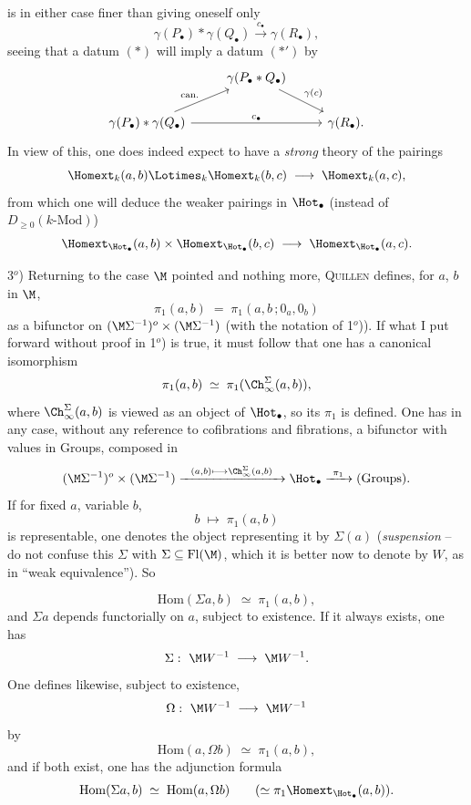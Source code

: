 is in either case finer than giving oneself only
\[
\gamma(P_{\bullet}) * \gamma(Q_{\bullet}) \xrightarrow{\ c_{\bullet}\ } \gamma(R_{\bullet}), \tag*{$(*')$}
\]
seeing that a datum $(*)$ will imply a datum $(*')$ by %
\[
\begin{tikzcd}
 & \gamma(P_{\bullet} * Q_{\bullet}) \arrow[dr, "\gamma(c)"] & \\
\gamma(P_{\bullet}) * \gamma(Q_{\bullet}) \arrow[ur, "\text{can.}"] \arrow[rr, "c_{\bullet}"] & & \gamma(R_{\bullet}).
\end{tikzcd}
\]
In view of this, one does indeed expect to have a \textit{strong} theory of the pairings
\[
\Homext_k(a,b) \Lotimes_k \Homext_k(b,c) \;\longrightarrow\; \Homext_k(a,c),
\]
from which one will deduce the weaker pairings in $\Hot_{\bullet}$ (instead of $D_{\geq 0}(k\text{-Mod})$)
\[
\Homext_{\Hot_{\bullet}}(a,b) \times \Homext_{\Hot_{\bullet}}(b,c) \;\longrightarrow\; \Homext_{\Hot_{\bullet}}(a,c).
\]

3$^o$) Returning to the case $\M$ pointed and nothing more, \textsc{Quillen} defines, for $a$, $b$ in $\M$,
\[
\pi_1(a,b) \;=\; \pi_1(a,b\,;0_a,0_b)
\]
as a bifunctor on $(\M\Sigma^{-1})^o\times(\M\Sigma^{-1})$ (with the notation of 1$^o$)). If what I put forward without proof in 1$^o$) is true, it must follow that one has a canonical isomorphism
\[
\pi_1(a,b) \;\simeq\; \pi_1(\Ch^{\Sigma}_{\infty}(a,b)),
\]
where $\Ch^{\Sigma}_{\infty}(a,b)$ is viewed as an object of $\Hot_{\bullet}$, so its $\pi_1$ is defined. One has in any case, without any reference to cofibrations and fibrations, a bifunctor with values in Groups, composed in
\[
(\M\Sigma^{-1})^o\times(\M\Sigma^{-1}) \xrightarrow{\ \ (a,b)\longmapsto \Ch^{\Sigma}_{\infty}(a,b)\ \ } \Hot_{\bullet} \xrightarrow{\ \pi_1\ } (\text{Groups}).
\]
If for fixed $a$, variable $b$,
\[
b \;\longmapsto\; \pi_1(a,b)
\]
is representable, one denotes the object representing it by $\Sigma(a)$ (\textit{suspension} -- do not confuse this $\Sigma$ with $\Sigma \subseteq \mathrm{Fl}(\M)$, which it is better now to denote by $W$, as in ``weak equivalence''). So


\[
\mathrm{Hom}(\Sigma a,b) \;\simeq\; \pi_1(a,b),
\]
and $\Sigma a$ depends functorially on $a$, subject to existence. If it always exists, one has
\[
\Sigma :\ \M W^{-1} \;\longrightarrow\; \M W^{-1}.
\]
One defines likewise, subject to existence,
\[
\Omega :\ \M W^{-1} \;\longrightarrow\; \M W^{-1}
\]
by
\[
\mathrm{Hom}(a,\Omega b) \;\simeq\; \pi_1(a,b),
\]
and if both exist, one has the adjunction formula
\[
\mathrm{Hom}(\Sigma a,b) \;\simeq\; \mathrm{Hom}(a,\Omega b) \qquad (\simeq \pi_1\Homext_{\Hot_{\bullet}}(a,b)).
\]